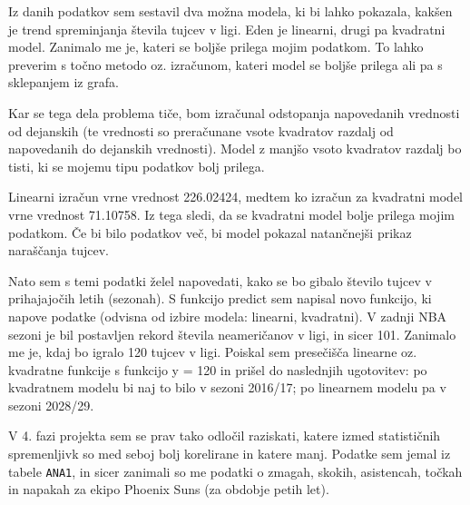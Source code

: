 \documentclass[11pt,a4paper]{article}
\begin{document}
Iz danih podatkov sem sestavil dva možna modela, ki bi lahko pokazala, kakšen je trend spreminjanja števila tujcev v ligi. Eden je linearni, drugi pa kvadratni model. Zanimalo me je, kateri se boljše prilega mojim podatkom. 
To lahko preverim s točno metodo oz. izračunom, kateri model se boljše prilega ali pa s sklepanjem iz grafa.

\smallskip

Kar se tega dela problema tiče, bom izračunal odstopanja napovedanih vrednosti od dejanskih (te vrednosti so preračunane vsote kvadratov razdalj od napovedanih do dejanskih vrednosti). Model z manjšo vsoto kvadratov razdalj bo tisti, ki se mojemu tipu podatkov bolj prilega.

\smallskip

Linearni izračun vrne vrednost 226.02424, medtem ko izračun za kvadratni model vrne vrednost 71.10758. Iz tega sledi, da se kvadratni model bolje prilega mojim podatkom. Če bi bilo podatkov več, bi model pokazal natančnejši prikaz naraščanja tujcev.

\smallskip


Nato sem s temi podatki želel napovedati, kako se bo gibalo število tujcev v prihajajočih letih (sezonah). S funkcijo predict sem napisal novo funkcijo, ki napove podatke (odvisna od izbire modela: linearni, kvadratni). V zadnji NBA sezoni je bil postavljen rekord števila neameričanov v ligi, in sicer 101. Zanimalo me je, kdaj bo igralo 120 tujcev v ligi. Poiskal sem presečišča linearne oz. kvadratne funkcije s funkcijo y = 120 in prišel do naslednjih ugotovitev: po kvadratnem modelu bi naj to bilo v sezoni 2016/17;
po linearnem modelu pa v sezoni 2028/29.

\smallskip


\newpage
V 4. fazi projekta sem se prav tako odločil raziskati, katere izmed statističnih spremenljivk so med seboj bolj korelirane in katere manj. Podatke sem jemal iz tabele \verb|ANA1|, in sicer zanimali so me podatki o zmagah, skokih, asistencah, točkah in napakah za ekipo Phoenix Suns (za obdobje petih let).

\smallskip
\end{document}
